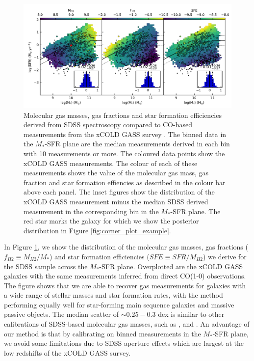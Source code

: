 \documentclass[fleqn,usenatbib]{mnras}
\begin{document}
\begin{figure}
    \centering
    \includegraphics[width=\textwidth]{figures/fig10.pdf}
    \caption{Molecular gas masses, gas fractions and star formation efficiencies derived from SDSS spectroscopy compared to CO-based measurements from the xCOLD GASS survey \citep{saintonge2017}. The binned data in the $M_{*}$-SFR plane are the median measurements derived in each bin with 10 measurements or more. The coloured data points show the xCOLD GASS measurements. The colour of each of these measurements shows the value of the molecular gas mass, gas fraction and star formation effiencies as described in the colour bar above each panel. The inset figures show the distribution of the xCOLD GASS measurement minus the median SDSS derived measurement in the corresponding bin in the $M_{*}$-SFR plane. The red star marks the galaxy for which we show the posterior distribution in Figure \ref{fig:corner_plot_example}.}
    \label{fig:MH2_FH2_SFE_comparison_xCOLDGASS}
\end{figure}

In Figure \ref{fig:MH2_FH2_SFE_comparison_xCOLDGASS}, we show the distribution of the molecular gas masses, gas fractions ($f_{H2} \equiv M_{H2}/M_{\ast}$) and star formation efficiencies ($SFE \equiv SFR / M_{H2}$) we derive for the SDSS sample across the $M_{*}$-SFR plane. Overplotted are the xCOLD GASS galaxies with the same measurements inferred from direct CO(1-0) observations.  The figure shows that we are able to recover gas measurements for galaxies with a wide range of stellar masses and star formation rates, with the method performing equally well for star-forming main sequence galaxies and massive passive objects. 
The median scatter of $\sim0.25-0.3$ dex is similar to other calibrations of SDSS-based molecular gas masses, such as \cite{concas2019}, \cite{yesuf2019} and \cite{piotrowska2020}. An advantage of our method is that by calibrating on binned measurements in the $M_{*}$-SFR plane, we avoid some limitations due to SDSS aperture effects which are largest at the low redshifts of the xCOLD GASS survey. 
\end{document}
